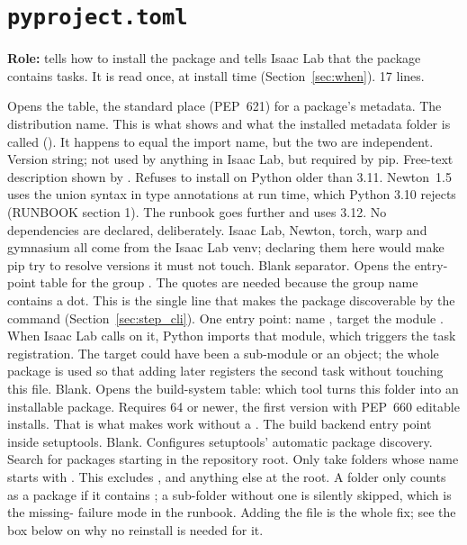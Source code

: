 \chapter{\texttt{pyproject.toml}}
\label{ch:pyproject}

\textbf{Role:} tells  how to install the package and tells Isaac Lab
that the package contains tasks. It is read once, at install time
(Section~\ref{sec:when}). 17 lines.


\begin{explain}
 Opens the \code{[project]} table, the standard place (PEP~621) for a
  package's metadata.
 The distribution name. This is what  shows and what the
  installed metadata folder is called ().
  It happens to equal the import name, but the two are independent.
 Version string; not used by anything in Isaac Lab, but required by pip.
 Free-text description shown by .
 Refuses to install on Python older than 3.11. Newton~1.5 uses the
   union syntax in type annotations at run time, which Python
  3.10 rejects (RUNBOOK section 1). The runbook goes further and uses 3.12.
 No dependencies are declared, deliberately. Isaac Lab, Newton, torch,
  warp and gymnasium all come from the Isaac Lab venv; declaring them here
  would make pip try to resolve versions it must not touch.
 Blank separator.
 Opens the entry-point table for the group . The
  quotes are needed because the group name contains a dot. This is the single
  line that makes the package discoverable by the  command
  (Section~\ref{sec:step_cli}).
 One entry point: name , target the module
  . When Isaac Lab calls  on it,
  Python imports that module, which triggers the task registration. The
  target could have been a sub-module or an object; the whole package is used
  so that adding  later registers the second
  task without touching this file.
 Blank.
 Opens the build-system table: which tool turns this folder into an
  installable package.
 Requires  64 or newer, the first version with
  PEP~660 editable installs. That is what makes  work
  without a .
 The build backend entry point inside setuptools.
 Blank.
 Configures setuptools' automatic package discovery.
 Search for packages starting in the repository root.
 Only take folders whose name starts with . This
  excludes ,  and anything else at the root. A
  folder only counts as a package if it contains ; a
  sub-folder without one is silently skipped, which is the
  missing- failure mode in the runbook. Adding the file is
  the whole fix; see the box below on why no reinstall is needed for it.
\end{explain}

